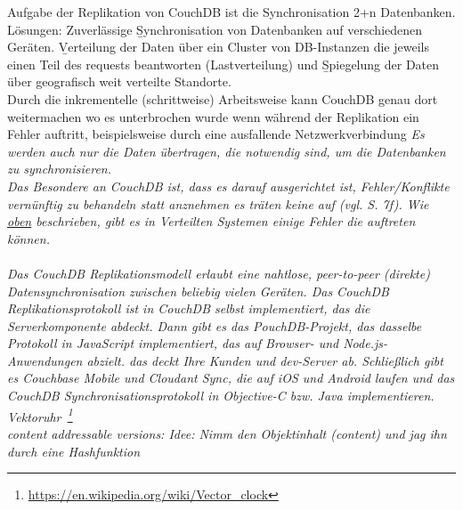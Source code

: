 
Aufgabe der Replikation von CouchDB ist die Synchronisation 2+n Datenbanken. Lösungen: Zuverlässige \b{Synchronisation} von Datenbanken auf verschiedenen Geräten. \b{Verteilung} der Daten über ein Cluster von DB-Instanzen die jeweils einen Teil des requests beantworten (Lastverteilung) und \b{Spiegelung} der Daten über geografisch weit verteilte Standorte.\\
Durch die inkrementelle (schrittweise) Arbeitsweise kann CouchDB genau dort weitermachen wo es unterbrochen wurde wenn während der Replikation ein Fehler auftritt, beispielsweise durch eine ausfallende Netzwerkverbindung
\it{Es werden auch nur die Daten übertragen, die notwendig sind, um die Datenbanken zu synchronisieren.}\\
Das Besondere an CouchDB ist, dass es darauf ausgerichtet ist, Fehler/Konflikte vernünftig zu behandeln statt anznehmen es träten keine auf (vgl. \cite{couchDB} S. 7f). Wie \hyperref[sec:conflict]{oben} beschrieben, gibt es in Verteilten Systemen einige Fehler die auftreten können.\\\\
\it{Das CouchDB Replikationsmodell erlaubt eine nahtlose, peer-to-peer (direkte) Datensynchronisation zwischen beliebig vielen Geräten. Das CouchDB Replikationsprotokoll ist in CouchDB selbst implementiert, das die Serverkomponente abdeckt. Dann gibt es das PouchDB-Projekt, das dasselbe Protokoll in JavaScript implementiert, das auf Browser- und Node.js-Anwendungen abzielt. das deckt Ihre Kunden und dev-Server ab. Schließlich gibt es Couchbase Mobile und Cloudant Sync, die auf iOS und Android laufen und das CouchDB Synchronisationsprotokoll in Objective-C bzw. Java implementieren.}\\
Vektoruhr~\footnote{\url{https://en.wikipedia.org/wiki/Vector_clock}} \\
content addressable versions: Idee: Nimm den Objektinhalt (content) und jag ihn durch eine \gls{Hashfunktion}\\

